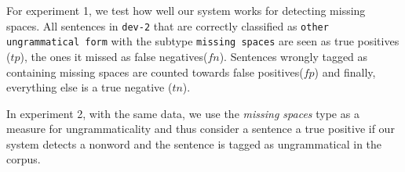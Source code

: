 \documentclass[a4paper,10pt]{scrartcl}
\begin{document}
For experiment 1, we test how well our system works for detecting missing spaces. All sentences in \texttt{dev-2} that are correctly classified as \texttt{other ungrammatical form} with the subtype \texttt{missing spaces} are seen as true positives ($tp$), the ones it missed as false negatives($fn$). Sentences wrongly tagged as containing missing spaces are counted towards false positives($fp$) and finally, everything else is a true negative ($tn$).

In experiment 2, with the same data, we use the \textit{missing spaces} type as a measure for ungrammaticality and thus consider a sentence a true positive if our system detects a nonword and the sentence is tagged as ungrammatical in the corpus.




\end{document}
